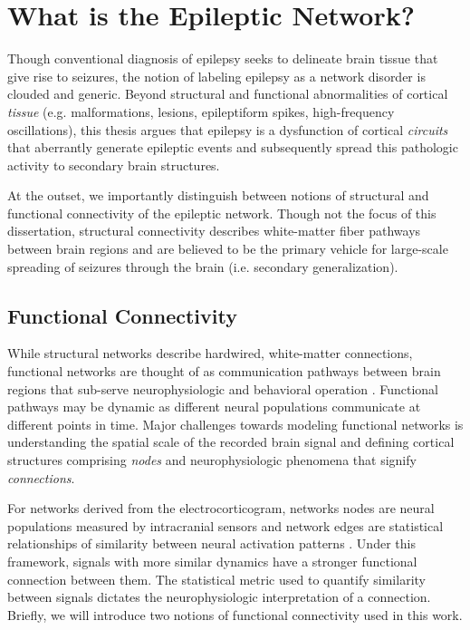 \section{What is the Epileptic Network?}
Though conventional diagnosis of epilepsy seeks to delineate brain tissue that give rise to seizures, the notion of labeling epilepsy as a network disorder is clouded and generic. Beyond structural and functional abnormalities of cortical \textit{tissue} (e.g. malformations, lesions, epileptiform spikes, high-frequency oscillations), this thesis argues that epilepsy is a dysfunction of cortical \textit{circuits} that aberrantly generate epileptic events and subsequently spread this pathologic activity to secondary brain structures. 

At the outset, we importantly distinguish between notions of structural and functional connectivity of the epileptic network. Though not the focus of this dissertation, structural connectivity describes white-matter fiber pathways between brain regions and are believed to be the primary vehicle for large-scale spreading of seizures through the brain (i.e. secondary generalization). 

\subsection{Functional Connectivity}
While structural networks describe hardwired, white-matter connections, functional networks are thought of as communication pathways between brain regions that sub-serve neurophysiologic and behavioral operation \cite{bullmore2011brain, friston2011functional, hutchison2013dynamic}. Functional pathways may be dynamic as different neural populations communicate at different points in time. Major challenges towards modeling functional networks is understanding the spatial scale of the recorded brain signal and defining cortical structures comprising \textit{nodes} and neurophysiologic phenomena that signify \textit{connections}.

For networks derived from the electrocorticogram, networks nodes are neural populations measured by intracranial sensors and network edges are statistical relationships of similarity between neural activation patterns \cite{bullmore2011brain, friston2011functional, hutchison2013dynamic}. Under this framework, signals with more similar dynamics have a stronger functional connection between them. The statistical metric used to quantify similarity between signals dictates the neurophysiologic interpretation of a connection. Briefly, we will introduce two notions of functional connectivity used in this work.

